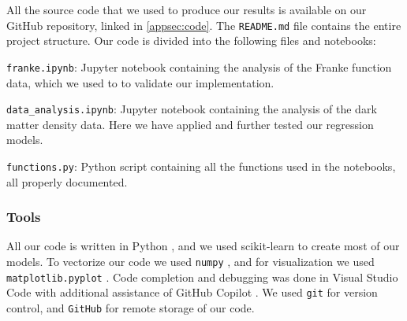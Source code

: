 \documentclass[aps,pra,english,notitlepage,reprint,nofootinbib]{revtex4-1}  %
\begin{document}
All the source code that we used to produce our results is available on our GitHub repository, linked in \cref{appsec:code}. The \verb|README.md| file contains the entire project structure. Our code is divided into the following files and notebooks:

\verb|franke.ipynb|: Jupyter notebook containing the analysis of the Franke function data, which we used to to validate our implementation.

\verb|data_analysis.ipynb|: Jupyter notebook containing the analysis of the dark matter density data. Here we have applied and further tested our regression models.

\verb|functions.py|: Python script containing all the functions used in the notebooks, all properly documented.

\subsubsection{Tools}\label{subsubsec:tools}
All our code is written in Python \cite{Python}, and we used scikit-learn \cite{scikit-learn} to create most of our models. To vectorize our code we used \verb|numpy| \cite{Numpy}, and for visualization we used \verb|matplotlib.pyplot| \cite{Matplotlib}. Code completion and debugging was done in Visual Studio Code \cite{VSCode} with additional assistance of GitHub Copilot \cite{Copilot}. We used \verb|git| \cite{Git} for version control, and \verb|GitHub| \cite{GitHub} for remote storage of our code.

\end{document}
